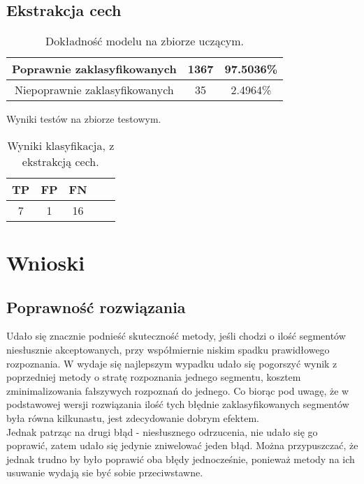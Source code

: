 \documentclass{classrep}
\begin{document}
\subsection{Ekstrakcja cech}


\begin{table}[H]
\centering
\begin{tabular}{|c|c|c|}
\hline 
Poprawnie zaklasyfikowanych &  1367 & 97.5036\% \\ 
\hline 
Niepoprawnie zaklasyfikowanych & 35 & 2.4964\% \\
\hline 
\end{tabular} 
\caption{Dokładność modelu na zbiorze uczącym.}
\label{wyniki:eksproc}
\end{table}


Wyniki testów na zbiorze testowym.

\begin{table}[H]
\centering
\begin{tabular}{|c|c|c|c|c|}
\hline 
TP &  FP &  FN\\
\hline
7  &   1 &  16\\
\hline
\end{tabular} 

\caption{Wyniki klasyfikacja, z ekstrakcją cech.}
\label{wyniki:ekswsk}
\end{table}




\section{Wnioski}

\subsection{Poprawność rozwiązania}
Udało się znacznie podnieść skuteczność metody, jeśli chodzi o ilość segmentów niesłusznie akceptowanych, przy współmiernie niskim spadku  prawidłowego rozpoznania. W wydaje się najlepszym wypadku udało się pogorszyć wynik z poprzedniej metody o stratę rozpoznania jednego segmentu, kosztem zminimalizowania fałszywych rozpoznań do jednego. Co biorąc pod uwagę, że  w podstawowej wersji rozwiązania ilość tych błędnie zaklasyfikowanych segmentów była równa kilkunastu, jest zdecydowanie dobrym efektem.\\
Jednak patrząc na drugi błąd - niesłusznego odrzucenia, nie udało się go poprawić, zatem udało się jedynie zniwelować jeden błąd. Można przypuszczać, że jednak trudno by było poprawić oba błędy jednocześnie, ponieważ metody na ich usuwanie wydają sie być sobie przeciwstawne.\\
\end{document}
